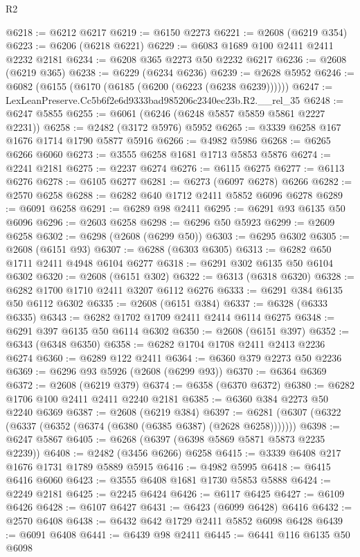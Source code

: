 \begin{lexlean}{R2}
\begin{coremodule}
@6218 := @6212 @6217
@6219 := @6150 @2273
@6221 := @2608 (@6219 @354)
@6223 := @6206 (@6218 @6221)
@6229 := @6083 @1689 @100 @2411 @2411 @2232 @2181
@6234 := @6208 @365 @2273 @50 @2232 @6217
@6236 := @2608 (@6219 @365)
@6238 := @6229 (@6234 @6236)
@6239 := @2628 @5952
@6246 := @6082 (@6155 (@6170 (@6185 (@6200 (@6223 (@6238 @6239))))))
@6247 := LexLeanPreserve.Cc5b6f2e6d9333bad985206c2340ec23b.R2.__rel_35
@6248 := @6247 @5855
@6255 := @6061 (@6246 (@6248 @5857 @5859 @5861 @2227 @2231))
@6258 := @2482 (@3172 @5976) @5952
@6265 := @3339 @6258 @167 @1676 @1714 @1790 @5877 @5916
@6266 := @4982 @5986
@6268 := @6265 @6266 @6060
@6273 := @3555 @6258 @1681 @1713 @5853 @5876
@6274 := @2241 @2181
@6275 := @2237 @6274
@6276 := @6115 @6275
@6277 := @6113 @6276
@6278 := @6105 @6277
@6281 := @6273 (@6097 @6278) @6266
@6282 := @2570 @6258
@6288 := @6282 @640 @1712 @2411 @5852 @6096 @6278
@6289 := @6091 @6258
@6291 := @6289 @98 @2411
@6295 := @6291 @93 @6135 @50 @6096
@6296 := @2603 @6258
@6298 := @6296 @50 @5923
@6299 := @2609 @6258
@6302 := @6298 (@2608 (@6299 @50))
@6303 := @6295 @6302
@6305 := @2608 (@6151 @93)
@6307 := @6288 (@6303 @6305)
@6313 := @6282 @650 @1711 @2411 @4948 @6104 @6277
@6318 := @6291 @302 @6135 @50 @6104 @6302
@6320 := @2608 (@6151 @302)
@6322 := @6313 (@6318 @6320)
@6328 := @6282 @1700 @1710 @2411 @3207 @6112 @6276
@6333 := @6291 @384 @6135 @50 @6112 @6302
@6335 := @2608 (@6151 @384)
@6337 := @6328 (@6333 @6335)
@6343 := @6282 @1702 @1709 @2411 @2414 @6114 @6275
@6348 := @6291 @397 @6135 @50 @6114 @6302
@6350 := @2608 (@6151 @397)
@6352 := @6343 (@6348 @6350)
@6358 := @6282 @1704 @1708 @2411 @2413 @2236 @6274
@6360 := @6289 @122 @2411
@6364 := @6360 @379 @2273 @50 @2236
@6369 := @6296 @93 @5926 (@2608 (@6299 @93))
@6370 := @6364 @6369
@6372 := @2608 (@6219 @379)
@6374 := @6358 (@6370 @6372)
@6380 := @6282 @1706 @100 @2411 @2411 @2240 @2181
@6385 := @6360 @384 @2273 @50 @2240 @6369
@6387 := @2608 (@6219 @384)
@6397 := @6281 (@6307 (@6322 (@6337 (@6352 (@6374 (@6380 (@6385 @6387) (@2628 @6258)))))))
@6398 := @6247 @5867
@6405 := @6268 (@6397 (@6398 @5869 @5871 @5873 @2235 @2239))
@6408 := @2482 (@3456 @6266) @6258
@6415 := @3339 @6408 @217 @1676 @1731 @1789 @5889 @5915
@6416 := @4982 @5995
@6418 := @6415 @6416 @6060
@6423 := @3555 @6408 @1681 @1730 @5853 @5888
@6424 := @2249 @2181
@6425 := @2245 @6424
@6426 := @6117 @6425
@6427 := @6109 @6426
@6428 := @6107 @6427
@6431 := @6423 (@6099 @6428) @6416
@6432 := @2570 @6408
@6438 := @6432 @642 @1729 @2411 @5852 @6098 @6428
@6439 := @6091 @6408
@6441 := @6439 @98 @2411
@6445 := @6441 @116 @6135 @50 @6098

\end{coremodule}
\end{lexlean}
